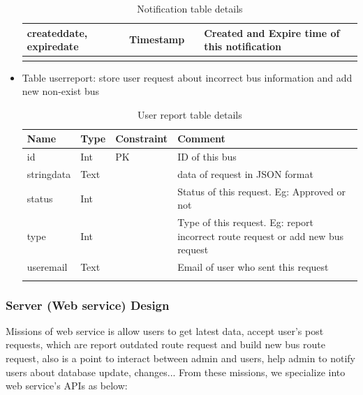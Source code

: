 \begin{itemize}
\begin{center}
\begin{longtable}{|p{4cm}|p{2cm}|p{3cm}|>{\raggedright\arraybackslash}p{5cm}|}
							\hline
							createddate, expiredate & Timestamp & & Created and Expire time of this notification \\
							\hline
							\caption{Notification table details}	
							\label{table:notification_table} 
						\end{longtable}
					\end{center}
				\item{Table userreport}: store user request about incorrect bus information and add new non-exist bus
					\begin{center}
						\begin{longtable}{|p{4cm}|p{2cm}|p{3cm}|>{\raggedright\arraybackslash}p{5cm}|} 
							\hline
							\bfseries Name & \bfseries Type & \bfseries Constraint & \bfseries Comment\\ [0.5ex] 
							\hline\hline
							id & Int & PK & ID of this bus \\
							\hline
							stringdata & Text & & data of request in JSON format \\
							\hline
							status & Int & & Status of this request. Eg: Approved or not \\
							\hline
							type & Int & & Type of this request. Eg: report incorrect route request or add new bus request \\
							\hline
							useremail & Text & & Email of user who sent this request \\
							\hline
							\caption{User report table details}	
							\label{table:userreport_table} 
						\end{longtable}
					\end{center}
			\end{itemize}
	\subsubsection{Server (Web service) Design} \label{sssec:server_design}
		Missions of web service is allow users to get latest data, accept user's post requests, which are report outdated route request and build new bus route request, also is a point to interact between admin and users, help admin to notify users about database update, changes...
		From these missions, we specialize into web service's APIs as below:
